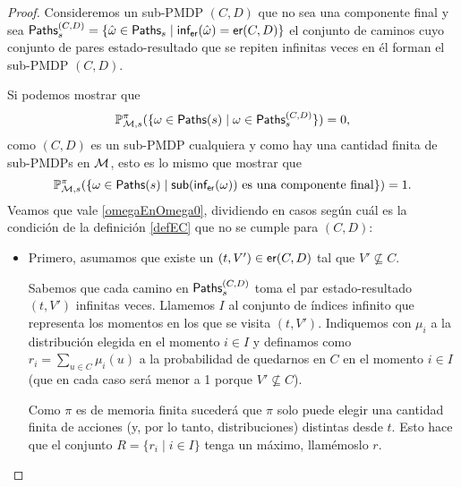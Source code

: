 \begin{proof}
	Consideremos un sub-PMDP $(C,D)$ que no sea una componente final y sea $\textsf{Paths}_s^{(C,D)} = \{\hat{\omega} \in \textsf{Paths}_s \mid \textsf{inf}_\textsf{er}(\hat{\omega}) = \textsf{er}(C, D)\}$ el conjunto de caminos cuyo conjunto de pares estado-resultado que se repiten infinitas veces en él forman el sub-PMDP $(C,D)$.

	Si podemos mostrar que
	\begin{equation}\label{omegaEnOmega0}
		\mathbb{P}^\pi_{\mathcal{M}, s}(\{ \omega \in \textsf{Paths}(s) \mid \omega \in \textsf{Paths}_s^{(C,D)}\}) = 0,
	\end{equation}
	como $(C,D)$ es un sub-PMDP cualquiera y como hay una cantidad finita de sub-PMDPs en $\mathcal{M}$, esto es lo mismo que mostrar que
	$$\mathbb{P}^\pi_{\mathcal{M}, s}(\{ \omega \in \textsf{Paths}(s) \mid \textsf{sub}(\textsf{inf}_\textsf{er}(\omega)) \text{ es una componente final}\}) = 1.$$
	Veamos que vale \ref{omegaEnOmega0}, dividiendo en casos según cuál es la
	condición de la definición \ref{defEC} que no se cumple para $(C,D)$:

	\begin{itemize}
		\item Primero, asumamos que existe un $(t, V') \in \textsf{er}(C,D)$ tal que $V' \nsubseteq
			      C$.



		      Sabemos que cada camino en $\textsf{Paths}_s^{(C,D)}$ toma el par estado-resultado $(t,
			      V')$ infinitas veces. Llamemos $I$ al conjunto de índices infinito que
		      representa los momentos en los que se visita $(t, V')$. Indiquemos con $\mu_i$
		      a la distribución elegida en el momento $i \in I$ y definamos como $r_i =
			      \sum_{u \in C} \mu_i(u)$ a la probabilidad de quedarnos en $C$ en el momento $i
			      \in I$ (que en cada caso será menor a 1 porque $V' \nsubseteq C$). %

		      Como $\pi$ es de memoria finita sucederá que $\pi$ solo puede elegir una
		      cantidad finita de acciones (y, por lo tanto, distribuciones) distintas desde
		      $t$. Esto hace que el conjunto $R = \{r_i \mid i \in I\}$ tenga un máximo,
		      llamémoslo $r$.


\end{itemize}
\end{proof}

